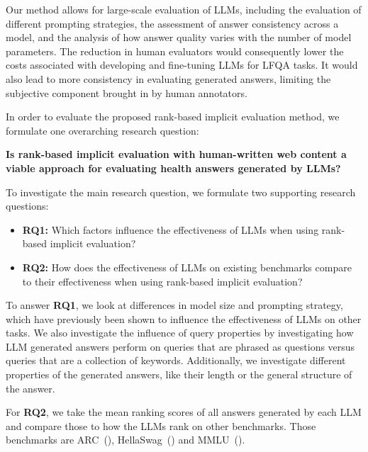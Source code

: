 Our method allows for large-scale evaluation of LLMs, including the evaluation of different prompting strategies, the assessment of answer consistency across a model, and the analysis of how answer quality varies with the number of model parameters.
The reduction in human evaluators would consequently lower the costs associated with developing and fine-tuning LLMs for LFQA tasks.
It would also lead to more consistency in evaluating generated answers, limiting the subjective component brought in by human annotators.

In order to evaluate the proposed rank-based implicit evaluation method, we formulate one overarching research question:

\begin{center}
\textbf{Is rank-based implicit evaluation with human-written web content a viable approach for evaluating health answers generated by LLMs?}
\end{center}

To investigate the main research question, we formulate two supporting research questions:

\begin{itemize}
    \item \textbf{RQ1:} Which factors influence the effectiveness of LLMs when using rank-based implicit evaluation?
    \item \textbf{RQ2:} How does the effectiveness of LLMs on existing benchmarks compare to their effectiveness when using rank-based implicit evaluation?
\end{itemize}

To answer \textbf{RQ1}, we look at differences in model size and prompting strategy, which have previously been shown to influence the effectiveness of LLMs on other tasks.
We also investigate the influence of query properties by investigating how LLM generated answers perform on queries that are phrased as questions versus queries that are a collection of keywords.
Additionally, we investigate different properties of the generated answers, like their length or the general structure of the answer.

For \textbf{RQ2}, we take the mean ranking scores of all answers generated by each LLM and compare those to how the LLMs rank on other benchmarks.
Those benchmarks are ARC~(\cite{clark:2018:Think}), HellaSwag~(\cite{zellers:2019:HellaSwag}) and MMLU~(\cite{hendrycks:2020:Measuring}).

